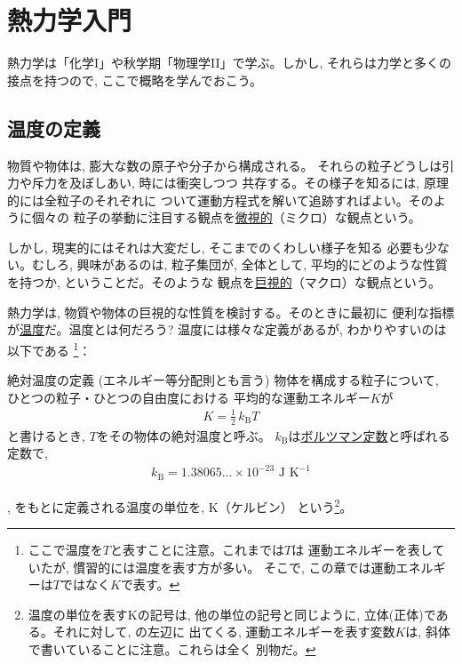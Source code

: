 \chapter{熱力学入門}

熱力学は「化学I」や秋学期「物理学II」で学ぶ。しかし, 
それらは力学と多くの接点を持つので, ここで概略を学んでおこう。

\section{温度の定義}

物質や物体は, 膨大な数の原子や分子から構成される。
それらの粒子どうしは引力や斥力を及ぼしあい, 時には衝突しつつ
共存する。その様子を知るには, 原理的には全粒子のそれぞれに
ついて運動方程式を解いて追跡すればよい。そのように個々の
粒子の挙動に注目する観点を\underline{微視的}（ミクロ）な観点という。

しかし, 現実的にはそれは大変だし, そこまでのくわしい様子を知る
必要も少ない。むしろ, 興味があるのは, 粒子集団が, 全体として, 
平均的にどのような性質を持つか, ということだ。そのような
観点を\underline{巨視的}（マクロ）な観点という。

熱力学は, 物質や物体の巨視的な性質を検討する。そのときに最初に
便利な指標が\underline{温度}だ。温度とは何だろう?
温度には様々な定義があるが, わかりやすいのは以下である
\footnote{ここで温度を$T$と表すことに注意。これまでは$T$は
運動エネルギーを表していたが, 慣習的には温度を表す方が多い。
そこで, この章では運動エネルギーは$T$ではなく$K$で表す。}：

\begin{itembox}{絶対温度の定義 (エネルギー等分配則とも言う)}\label{def:temperature0}
物体を構成する粒子について, ひとつの粒子・ひとつの自由度における
平均的な運動エネルギー$K$が
\begin{eqnarray}K=\frac{1}{2}\,k_{\text{B}}T\label{eq:def_temperature0}\end{eqnarray}
と書けるとき, $T$をその物体の絶対温度と呼ぶ。
$k_{\text{B}}$は\underline{ボルツマン定数}と呼ばれる定数で, 
\begin{eqnarray}
k_{\text{B}}=1.38065...\times10^{-23}\text{ J K}^{-1}\label{eq:def_Bolconst}
\end{eqnarray}
\end{itembox}
, をもとに定義される温度の単位を, K（ケルビン）
という\footnote{温度の単位を表すKの記号は, 他の単位の記号と同じように, 
立体(正体)である。それに対して, の左辺に
出てくる, 運動エネルギーを表す変数$K$は, 斜体で書いていることに注意。これらは全く
別物だ。}。

